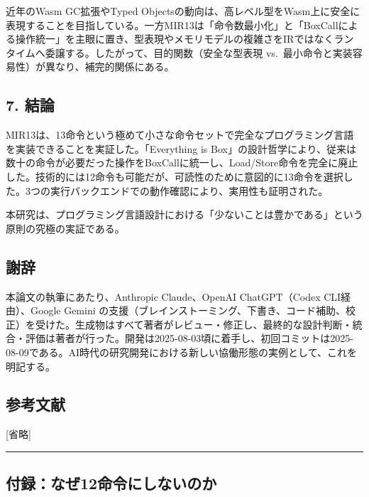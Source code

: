 \documentclass[
]{article}
\begin{document}
近年のWasm GC拡張やTyped
Objectsの動向は、高レベル型をWasm上に安全に表現することを目指している。一方MIR13は「命令数最小化」と「BoxCallによる操作統一」を主眼に置き、型表現やメモリモデルの複雑さをIRではなくランタイムへ委譲する。したがって、目的関数（安全な型表現
vs.~最小命令と実装容易性）が異なり、補完的関係にある。

\hypertarget{ux7d50ux8ad6}{%
\subsection{7. 結論}\label{ux7d50ux8ad6}}

MIR13は、13命令という極めて小さな命令セットで完全なプログラミング言語を実装できることを実証した。「Everything
is
Box」の設計哲学により、従来は数十の命令が必要だった操作をBoxCallに統一し、Load/Store命令を完全に廃止した。技術的には12命令も可能だが、可読性のために意図的に13命令を選択した。3つの実行バックエンドでの動作確認により、実用性も証明された。

本研究は、プログラミング言語設計における「少ないことは豊かである」という原則の究極の実証である。

\hypertarget{ux8b1dux8f9e}{%
\subsection{謝辞}\label{ux8b1dux8f9e}}

本論文の執筆にあたり、Anthropic Claude、OpenAI ChatGPT（Codex
CLI経由）、Google Gemini
の支援（ブレインストーミング、下書き、コード補助、校正）を受けた。生成物はすべて著者がレビュー・修正し、最終的な設計判断・統合・評価は著者が行った。開発は2025-08-03頃に着手し、初回コミットは2025-08-09である。AI時代の研究開発における新しい協働形態の実例として、これを明記する。

\hypertarget{ux53c2ux8003ux6587ux732e}{%
\subsection{参考文献}\label{ux53c2ux8003ux6587ux732e}}

{[}省略{]}

\begin{center}\rule{0.5\linewidth}{0.5pt}\end{center}

\hypertarget{ux4ed8ux9332ux306aux305c12ux547dux4ee4ux306bux3057ux306aux3044ux306eux304b}{%
\subsection{付録：なぜ12命令にしないのか}\label{ux4ed8ux9332ux306aux305c12ux547dux4ee4ux306bux3057ux306aux3044ux306eux304b}}
\end{document}
